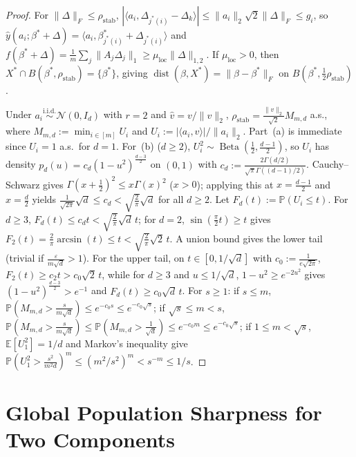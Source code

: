 \documentclass[11pt]{article}
\theoremstyle{plain}
\theoremstyle{remark}
\numberwithin{equation}{section}
\newcommand{\E}{\mathbb{E}}
\newcommand{\Prob}{\mathbb{P}}
\newcommand{\ip}[2]{\langle #1, #2 \rangle}
\newcommand{\norm}[1]{\|#1\|}
\newcommand{\dist}{\operatorname{dist}}
\newcommand{\Fnorm}[1]{\|#1\|_F}
\newcommand{\Lonenorm}[1]{\|#1\|_{1,2}}
\begin{document}
\begin{proof}
For $\Fnorm{\Delta} \le \rho_{\mathrm{stab}}$, $|\ip{a_i}{\Delta_{j^*(i)} - \Delta_k}| \le \norm{a_i}_2\sqrt{2}\Fnorm{\Delta} \le g_i$, so $\hat y(a_i; \beta^* + \Delta) = \ip{a_i}{\beta_{j^*(i)}^* + \Delta_{j^*(i)}}$ and $f(\beta^* + \Delta) = \frac{1}{m}\sum_j \norm{A_j\Delta_j}_1 \ge \mu_{\mathrm{loc}}\Lonenorm{\Delta}$. If $\mu_{\mathrm{loc}} > 0$, then $X^* \cap B(\beta^*, \rho_{\mathrm{stab}}) = \{\beta^*\}$, giving $\dist(\beta, X^*) = \Fnorm{\beta - \beta^*}$ on $B(\beta^*, \frac{1}{2}\rho_{\mathrm{stab}})$.

Under $a_i \stackrel{\mathrm{i.i.d.}}{\sim} \mathcal{N}(0, I_d)$ with $r = 2$ and $\hat v = v/\norm{v}_2$, $\rho_{\mathrm{stab}} = \frac{\norm{v}_2}{\sqrt{2}} M_{m,d}$ a.s., where $M_{m,d} := \min_{i \in [m]} U_i$ and $U_i := |\ip{a_i}{\hat v}|/\norm{a_i}_2$. Part~(a) is immediate since $U_i = 1$ a.s.\ for $d = 1$. For~(b) ($d \ge 2$), $U_i^2 \sim \operatorname{Beta}(\frac{1}{2}, \frac{d-1}{2})$, so $U_i$ has density $p_d(u) = c_d(1 - u^2)^{\frac{d-3}{2}}$ on $(0, 1)$ with $c_d := \frac{2\Gamma(d/2)}{\sqrt{\pi}\Gamma((d-1)/2)}$. Cauchy--Schwarz gives $\Gamma(x + \frac{1}{2})^2 \le x\Gamma(x)^2$ ($x > 0$); applying this at $x = \frac{d-1}{2}$ and $x = \frac{d}{2}$ yields $\frac{1}{\sqrt{2\pi}}\sqrt{d} \le c_d < \sqrt{\frac{2}{\pi}}\sqrt{d}$ for all $d \ge 2$. Let $F_d(t) := \Prob(U_i \le t)$. For $d \ge 3$, $F_d(t) \le c_d t < \sqrt{\frac{2}{\pi}}\sqrt{d}\,t$; for $d = 2$, $\sin(\frac{\pi}{2}t) \ge t$ gives $F_2(t) = \frac{2}{\pi}\arcsin(t) \le t < \sqrt{\frac{2}{\pi}}\sqrt{2}\,t$. A union bound gives the lower tail (trivial if $\frac{\varepsilon}{m\sqrt{d}} > 1$). For the upper tail, on $t \in [0, 1/\sqrt{d}]$ with $c_0 := \frac{1}{e\sqrt{2\pi}}$, $F_2(t) \ge c_2 t > c_0\sqrt{2}\,t$, while for $d \ge 3$ and $u \le 1/\sqrt{d}$, $1 - u^2 \ge e^{-2u^2}$ gives $(1 - u^2)^{\frac{d-3}{2}} > e^{-1}$ and $F_d(t) \ge c_0\sqrt{d}\,t$. For $s \ge 1$: if $s \le m$, $\Prob(M_{m,d} > \frac{s}{m\sqrt{d}}) \le e^{-c_0 s} \le e^{-c_0\sqrt{s}}$; if $\sqrt{s} \le m < s$, $\Prob(M_{m,d} > \frac{s}{m\sqrt{d}}) \le \Prob(M_{m,d} > \frac{1}{\sqrt{d}}) \le e^{-c_0 m} \le e^{-c_0\sqrt{s}}$; if $1 \le m < \sqrt{s}$, $\E[U_1^2] = 1/d$ and Markov's inequality give $\Prob(U_1^2 > \frac{s^2}{m^2 d})^m \le (m^2/s^2)^m < s^{-m} \le 1/s$.
\end{proof}

\section{Global Population Sharpness for Two Components}
\label{sec:pop-r2}
\end{document}
